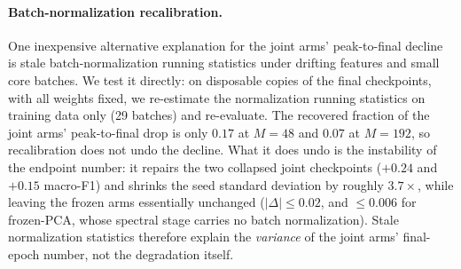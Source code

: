 \paragraph{Batch-normalization recalibration.}
One inexpensive alternative explanation for the joint arms'
peak-to-final decline is stale batch-normalization running statistics
under drifting features and small core batches. We test it directly:
on disposable copies of the final checkpoints, with all weights fixed,
we re-estimate the normalization running statistics on training data
only (29 batches) and re-evaluate. The recovered fraction of the joint
arms' peak-to-final drop is only $0.17$ at $M{=}48$ and $0.07$ at
$M{=}192$, so recalibration does not undo the decline. What it does
undo is the instability of the endpoint number: it repairs the two
collapsed joint checkpoints ($+0.24$ and $+0.15$ macro-F1) and shrinks
the seed standard deviation by roughly $3.7\times$, while leaving the
frozen arms essentially unchanged ($|\Delta| \le 0.02$, and
$\le 0.006$ for frozen-PCA, whose spectral stage carries no batch
normalization). Stale normalization statistics therefore explain the
\emph{variance} of the joint arms' final-epoch number, not the
degradation itself.

